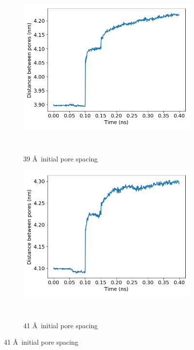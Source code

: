 \documentclass{article}
\begin{document}
\begin{enumerate}
  	  \begin{figure}[htp]
		\centering
		\begin{subfigure}{0.3\textwidth}
			\includegraphics[width=\textwidth]{p2p_39.png}\quad
			\vspace{-1.25em}
			\caption{39 \AA~initial pore spacing}~\label{fig:p2p_39}
		\end{subfigure}
		\begin{subfigure}{0.3\textwidth}
			\includegraphics[width=\textwidth]{p2p_41.png}\quad
			\vspace{-1.25em}
			\caption{41 \AA~initial pore spacing}~\label{fig:p2p_41}
		\end{subfigure}

\end{figure}
\end{enumerate}
\end{document}
